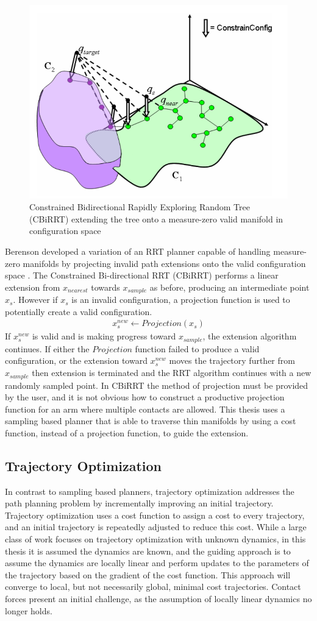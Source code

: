 \documentclass[../thesis.tex]{subfiles}
\begin{document}
\begin{figure}
  \centering
  \includegraphics[width=.5\linewidth]{./RelatedWork/CBiRRT.png}
  \caption{Constrained Bidirectional Rapidly Exploring Random Tree (CBiRRT) extending the tree onto a measure-zero valid manifold in configuration space}
  \label{fig:CiBRRT}
\end{figure}


Berenson developed a variation of an RRT planner capable of handling measure-zero manifolds by projecting invalid path extensions onto the valid configuration space \cite{Berenson2009a}.
The Constrained Bi-directional RRT (CBiRRT) performs a linear extension from $x_{nearest}$ towards $x_{sample}$ as before, producing an intermediate point $x_s$.
However if $x_s$ is an invalid configuration, a projection function is used to potentially create a valid configuration.
\begin{align}
  x_s^{new} \leftarrow Projection(x_s)
\end{align}
If $x_s^{new}$ is valid and is making progress toward $x_{sample}$, the extension algorithm continues.
If either the $Projection$ function failed to produce a valid configuration, or the extension toward $x_s^{new}$ moves the trajectory further from $x_{sample}$ then extension is terminated and the RRT algorithm continues with a new randomly sampled point.
In CBiRRT the method of projection must be provided by the user, and it is not obvious how to construct a productive projection function for an arm where multiple contacts are allowed. 
This thesis uses a sampling based planner that is able to traverse thin manifolds by using a cost function, instead of a projection function, to guide the extension.



\subsection{Trajectory Optimization}
In contrast to sampling based planners, trajectory optimization addresses the path planning problem by incrementally improving an initial trajectory.
Trajectory optimization uses a cost function to assign a cost to every trajectory, and an initial trajectory is repeatedly adjusted to reduce this cost.
While a large class of work focuses on trajectory optimization with unknown dynamics, in this thesis it is assumed the dynamics are known, and the guiding approach is to assume the dynamics are locally linear and perform updates to the parameters of the trajectory based on the gradient of the cost function.
This approach will converge to local, but not necessarily global, minimal cost trajectories.
Contact forces present an initial challenge, as the assumption of locally linear dynamics no longer holds.
\end{document}
